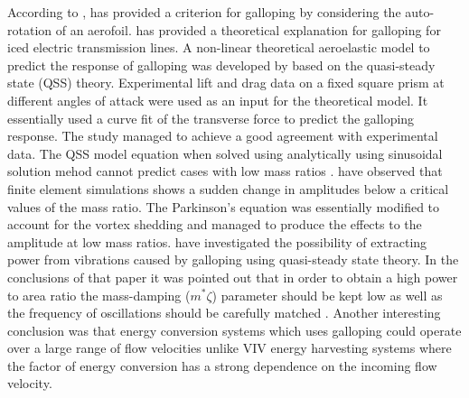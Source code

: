 According to \cite{Paidoussis2010},\cite{Glauert1919} has provided a criterion for galloping by considering the auto-rotation of an aerofoil.  \cite{DenHartog1956}  has provided a theoretical explanation for galloping for iced electric transmission lines. A non-linear theoretical aeroelastic model to predict the response of galloping was developed by \cite{Parkinson1964} based on the quasi-steady state (QSS) theory. Experimental lift and drag data on a fixed square prism at different angles of attack were used as an input for the theoretical model. It essentially used a curve fit of the transverse force to predict the galloping response. The study managed to achieve a good agreement with experimental data. The QSS model equation when solved using analytically using sinusoidal solution mehod cannot predict cases with low mass ratios  .\cite{Joly2012} have observed that finite element simulations shows a sudden change in amplitudes  below a critical values of the mass ratio. The Parkinson's equation was essentially modified to account for the vortex shedding and managed to produce the effects to the amplitude at low mass ratios.
\cite{Barrero-Gil2010a} have investigated the possibility of extracting power from vibrations caused by galloping using quasi-steady state theory. In the conclusions of that paper it was pointed out that in order to obtain a high power to area ratio the mass-damping ($m^*\zeta$) parameter should be kept low as well as the frequency of oscillations should be carefully matched . Another interesting conclusion was that energy conversion systems which uses galloping could operate over  a large range of flow velocities unlike VIV energy harvesting systems where the factor of energy conversion has a strong dependence on the incoming flow velocity. 